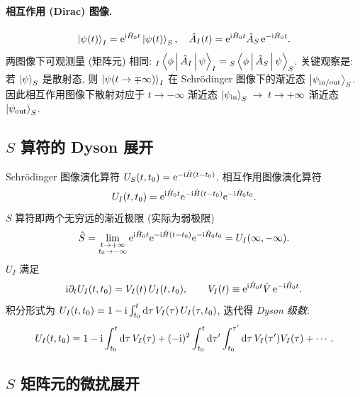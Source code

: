 \paragraph{相互作用 (Dirac) 图像.}
\begin{equation}
\ket{\psi(t)}_{I}=\mathrm{e}^{\mathrm{i}\hat{H}_{0}t}\ket{\psi(t)}_{S},\quad
\hat{A}_{I}(t)=\mathrm{e}^{\mathrm{i}\hat{H}_{0}t}\hat{A}_{S}\,\mathrm{e}^{-\mathrm{i}\hat{H}_{0}t}.
\end{equation}
两图像下可观测量 (矩阵元) 相同:
${}_{I}\left\langle \phi \,\middle|\, \hat{A}_{I} \,\middle|\, \psi \right\rangle_{I}={}_{S}\left\langle \phi \,\middle|\, \hat{A}_{S} \,\middle|\, \psi \right\rangle_{S}$. 关键观察是: 若 $\ket{\psi}_{S}$ 是散射态, 则 $\ket{\psi(t\to\mp\infty)}_{I}$ 在 Schrödinger 图像下的渐近态 $\ket{\psi_{\mathrm{in/out}}}_{S}$. 因此相互作用图像下散射对应于
$t\to -\infty$ 渐近态 $\ket{\psi_{\mathrm{in}}}_{S}\;\to\; t\to +\infty$ 渐近态 $\ket{\psi_{\mathrm{out}}}_{S}$.

\subsection{$S$ 算符的 Dyson 展开}

Schrödinger 图像演化算符 $U_{S}(t,t_{0})=\mathrm{e}^{-\mathrm{i}\hat{H}(t-t_{0})}$, 相互作用图像演化算符
\begin{equation}
U_{I}(t,t_{0})=\mathrm{e}^{\mathrm{i}\hat{H}_{0}t}\mathrm{e}^{-\mathrm{i}\hat{H}(t-t_{0})}\mathrm{e}^{-\mathrm{i}\hat{H}_{0}t_{0}}.
\end{equation}
$S$ 算符即两个无穷远的渐近极限 (实际为弱极限)
\begin{equation}
\hat{S}=\lim_{\substack{t\to+\infty\\ t_{0}\to-\infty}}
\mathrm{e}^{\mathrm{i}\hat{H}_{0}t}\mathrm{e}^{-\mathrm{i}\hat{H}(t-t_{0})}\mathrm{e}^{-\mathrm{i}\hat{H}_{0}t_{0}}=U_{I}(\infty,-\infty).
\label{eq:S-UI}
\end{equation}
$U_{I}$ 满足
\begin{equation}
\mathrm{i}\partial_{t}U_{I}(t,t_{0})=V_{I}(t)\,U_{I}(t,t_{0}),\qquad
V_{I}(t)\equiv \mathrm{e}^{\mathrm{i}\hat{H}_{0}t}\hat{V}\,\mathrm{e}^{-\mathrm{i}\hat{H}_{0}t}.
\end{equation}
积分形式为 $U_{I}(t,t_{0})=1-\mathrm{i}\int_{t_{0}}^{t}\mathrm{d}\tau\,V_{I}(\tau)\,U_{I}(\tau,t_{0})$, 迭代得 \emph{Dyson 级数}:
\begin{equation}
U_{I}(t,t_{0})=1-\mathrm{i}\int_{t_{0}}^{t}\mathrm{d}\tau\,V_{I}(\tau)
+(-\mathrm{i})^{2}\int_{t_{0}}^{t}\mathrm{d}\tau'\int_{t_{0}}^{\tau'}\mathrm{d}\tau\,V_{I}(\tau')V_{I}(\tau)+\cdots .
\label{eq:dyson}
\end{equation}

\subsection{$S$ 矩阵元的微扰展开}

